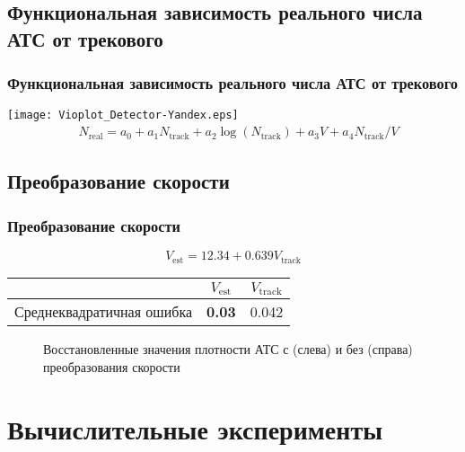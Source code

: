\subsection{Функциональная зависимость реального числа АТС от трекового}
\begin{frame}
    \frametitle{Функциональная зависимость реального числа АТС от трекового}
    \centering
    \texttt{[image: Vioplot\_Detector-Yandex.eps]}
    \begin{equation*}
        \begin{split}
            & N_{\text{real}} = a_0 + a_1N_{\text{track}} + a_2\log\left({N_{\text{track}}}\right) + a_3V + a_4N_{\text{track}}/V
        \end{split}
    \end{equation*}
\end{frame}

\subsection{Преобразование скорости}
\begin{frame}
    \frametitle{Преобразование скорости}
\vspace{-4mm}
\begin{equation*}
    V_{\text{est}} = 12.34 + 0.639V_{\text{track}}
    \label{eq::speed_transform}
\end{equation*}

\vspace{-2mm}
\begin{table}[!ht]
    \centering
    \begin{tabular}{|c|c|c|}
         \hline
         & $V_{\text{est}}$ & $V_{\text{track}}$ \\
         \hline
         Среднеквадратичная ошибка & \textbf{0.03} & 0.042 \\
         \hline
    \end{tabular}
\end{table}
\vspace{-4mm}

    \begin{figure}[!ht]
    \caption{Восстановленные значения плотности АТС с (слева) и без (справа) преобразования скорости}
    \end{figure}
\end{frame}


\section{Вычислительные эксперименты}
